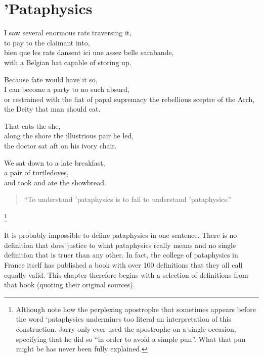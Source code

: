 
\chapter[Pataphysics]{'Pataphysics}
\label{ch:pataphysics}

\startcontents[chapters]

\vfill

I saw several enormous rats traversing it, \\
to pay to the claimant into, \\
bien que les rats dansent ici une assez belle sarabande, \\
with a Belgian hat capable of storing up.

Because fate would have it so, \\
I can become a party to no such absurd, \\
or restrained with the fiat of papal supremacy the rebellious sceptre of the Arch, \\
the Deity that man should eat.

That eats the she, \\
along the shore the illustrious pair he led, \\
the doctor sat aft on his ivory chair.

We sat down to a late breakfast, \\
a pair of turtledoves, \\
and took and ate the showbread.

\newpage
\minicontents
\spirals

\begin{quote}
  ``To understand $'$pataphysics is to fail to understand $'$pataphysics.'' \autocite{Hugill2012a}
\end{quote}

\footnote{Although note how the perplexing apostrophe that sometimes appears before the word ‘pataphysics undermines too literal an interpretation of this construction. Jarry only ever used the apostrophe on a single occasion, specifying that he did so ``in order to avoid a simple pun''. What that pun might be has never been fully explained.}

It is probably impossible to define pataphysics in one sentence. There is no definition that does justice to what pataphysics really means and no single definition that is truer than any other. In fact, the college of pataphysics in France itself has published a book \autocite{Brotchie2003} with over 100 definitions that they all call equally valid. This chapter therefore begins with a selection of definitions from that book (quoting their original sources).

